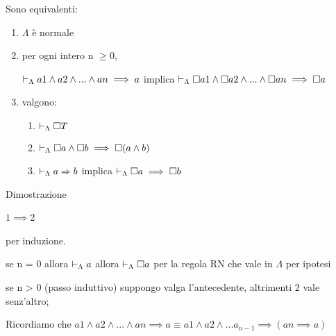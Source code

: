 Sono equivalenti: 
\begin{enumerate}
\item $\Lambda$ è normale 
\item per ogni intero n $\geq0$,


$\vdash_{\Lambda}a1\wedge a2\wedge...\wedge an\implies a$ implica $\vdash_{\Lambda}\square a1\wedge\square a2\wedge...\wedge\square a n\implies\square a$

\item valgono:

\begin{enumerate}
\item $\vdash_{\Lambda}\square T$ 
\item $\vdash_{\Lambda}\square a\wedge\square b\implies\square(a\wedge b)$ 
\item $\vdash_{\Lambda}a\Rightarrow b$ implica $\vdash_{\Lambda}\square a\implies\square b$ 
\end{enumerate}
\end{enumerate}
Dimostrazione

$1\implies$2

per induzione.

se n = 0 allora $\vdash_{\Lambda}a$ allora $\vdash_{\Lambda}\square a$ per la regola
RN che vale in $\Lambda$ per ipotesi

se n > 0 (passo induttivo) suppongo valga l'antecedente, altrimenti
2 vale senz'altro;

Ricordiamo che $a1\wedge a2\wedge...\wedge an\implies a\equiv a1\wedge a2\wedge...a_{n-1}\implies(an\implies a)$ 

